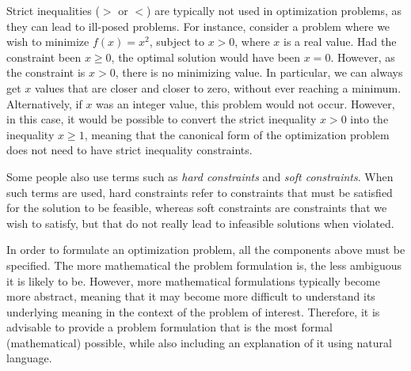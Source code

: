 \begin{itemize}
Strict inequalities ($>$ or $<$) are typically not used in optimization problems, as they can lead to ill-posed problems. For instance, consider a problem where we wish to minimize $f(x) = x^2$, subject to $x>0$, where $x$ is a real value. Had the constraint been $x \geq 0$, the optimal solution would have been $x=0$. However, as the constraint is $x>0$, there is no minimizing value. In particular, we can always get $x$ values that are closer and closer to zero, without ever reaching a minimum. Alternatively, if $x$ was an integer value, this problem would not occur. However, in this case, it would be possible to convert the strict inequality $x>0$ into the inequality $x\geq 1$, meaning that the canonical form of the optimization problem does not need to have strict inequality constraints.

Some people also use terms such as \textit{hard constraints} and \textit{soft constraints}. When such terms are used, hard constraints refer to constraints that must be satisfied for the solution to be feasible, whereas soft constraints are constraints that we wish to satisfy, but that do not really lead to infeasible solutions when violated.
\end{itemize}

In order to formulate an optimization problem, all the components above must be specified. The more mathematical the problem formulation is, the less ambiguous it is likely to be. However, more mathematical formulations typically become more abstract, meaning that it may become more difficult to understand its underlying meaning in the context of the problem of interest. Therefore, it is advisable to provide a problem formulation that is the most formal (mathematical) possible, while also including an explanation of it using natural language. %


